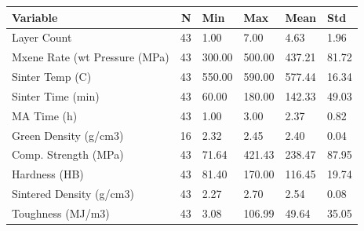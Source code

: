 \begin{tabular}{lrllll}
\toprule
Variable & N & Min & Max & Mean & Std \\
\midrule
Layer Count & 43 & 1.00 & 7.00 & 4.63 & 1.96 \\
Mxene Rate (wt%
Pressure (MPa) & 43 & 300.00 & 500.00 & 437.21 & 81.72 \\
Sinter Temp (C) & 43 & 550.00 & 590.00 & 577.44 & 16.34 \\
Sinter Time (min) & 43 & 60.00 & 180.00 & 142.33 & 49.03 \\
MA Time (h) & 43 & 1.00 & 3.00 & 2.37 & 0.82 \\
Green Density (g/cm3) & 16 & 2.32 & 2.45 & 2.40 & 0.04 \\
Comp. Strength (MPa) & 43 & 71.64 & 421.43 & 238.47 & 87.95 \\
Hardness (HB) & 43 & 81.40 & 170.00 & 116.45 & 19.74 \\
Sintered Density (g/cm3) & 43 & 2.27 & 2.70 & 2.54 & 0.08 \\
Toughness (MJ/m3) & 43 & 3.08 & 106.99 & 49.64 & 35.05 \\
\bottomrule
\end{tabular}
